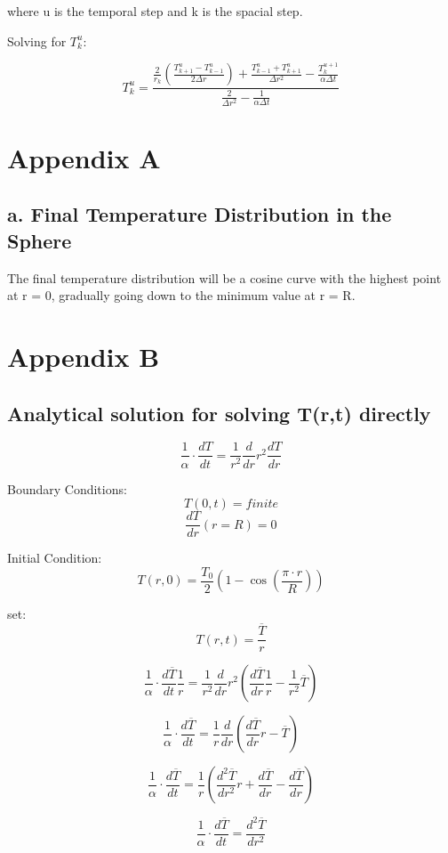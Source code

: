 \documentclass[12pt,letterpaper]{article}
\begin{document}
where u is the temporal step and k is the spacial step.

Solving for $T_k^u$:

\[T_k^u = \frac{\frac{2}{r_k} (\frac{T^u_{k+1}-T^u_{k-1}}{2 \Delta r}) + \frac{T^u_{k-1} + T^u_{k+1}}{\Delta r^2} - \frac{T_k^{u+1}}{\alpha \Delta t}}
{\frac{2}{\Delta r^2} - \frac{1}{\alpha \Delta t }}\]



\section{Appendix A}

\subsection{a. Final Temperature Distribution in the Sphere}
The final temperature distribution will be a cosine curve
with the highest point at r = 0, gradually going down to
the minimum value at r = R. 

\section{Appendix B}

\subsection{Analytical solution for solving T(r,t) directly}

\[\frac{1}{\alpha} \cdot \frac{dT}{dt} = \frac{1}{r^2} \frac{d}{dr} r^2 \frac{dT}{dr}\]

Boundary Conditions:
\[T(0,t) = finite \]
\[\frac{dT}{dr} (r = R) = 0 \]

Initial Condition:
\[T(r,0) = \frac{T_0}{2} (1-\cos{(\frac{\pi \cdot r}{R})}) \]

set:
\[T(r,t) = \frac{\overline{T}}{r} \]


\[\frac{1}{\alpha} \cdot \frac{d\overline{T}}{dt} \frac{1}{r} = \frac{1}{r^2} \frac{d}{dr} r^2 (\frac{d\overline{T}}{dr} \frac{1}{r} - \frac{1}{r^2} \overline{T}) \]

\[\frac{1}{\alpha} \cdot \frac{d\overline{T}}{dt} = \frac{1}{r} \frac{d}{dr} (\frac{d\overline{T}}{dr} r - \overline{T}) \]

\[\frac{1}{\alpha} \cdot \frac{d\overline{T}}{dt} = \frac{1}{r} (\frac{d^2\overline{T}}{dr^2} r + \frac{d\overline{T}}{dr} - \frac{d\overline{T}}{dr}) \]

\[\frac{1}{\alpha} \cdot \frac{d\overline{T}}{dt} = \frac{d^2\overline{T}}{dr^2} \]
\end{document}
